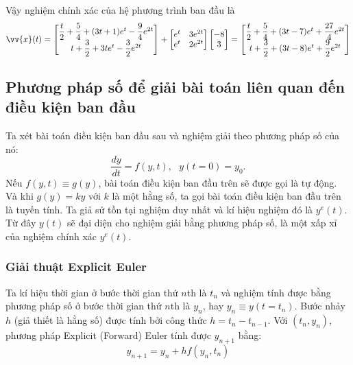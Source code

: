 \documentclass[a4paper]{article}
\begin{document}
Vậy nghiệm chính xác của hệ phương trình ban đầu là 
\[
    \vv{x}(t) = 
    \begin{bmatrix}
        \dfrac{t}{2} + \dfrac{5}{4} + (3t + 1)e^{t} - \dfrac{9}{4}e^{2t} \\
        t + \dfrac{3}{2} + 3te^{t} - \dfrac{3}{2}e^{2t}
    \end{bmatrix}
    + 
    \begin{bmatrix}
        e^t & 3e^{2t} \\
        e^t & 2e^{2t}
    \end{bmatrix}
    \begin{bmatrix}
        -8 \\
        3
    \end{bmatrix}
    = 
    \iffalse
    \begin{bmatrix}
        \dfrac{t}{2} + \dfrac{5}{4} + (3t + 1)e^{t} - \dfrac{9}{4}e^{2t} \\
        t + \dfrac{3}{2} + 3te^{t} - \dfrac{3}{2}e^{2t}
    \end{bmatrix}
    +
    \begin{bmatrix}
        -8e^{t} + 9e^{2t} \\
        -8e^{t} + 6e^{2t} 
    \end{bmatrix}
    =
    \fi
    \begin{bmatrix}
        \dfrac{t}{2} + \dfrac{5}{4} + (3t - 7)e^{t} + \dfrac{27}{4}e^{2t} \\
        t + \dfrac{3}{2} + (3t-8)e^{t} + \dfrac{9}{2}e^{2t}
    \end{bmatrix}
\]
\newpage
\subsection{Phương pháp số để giải bài toán liên quan đến điều kiện ban đầu}
Ta xét bài toán điều kiện ban đầu sau và nghiệm giải theo phương pháp số của nó:
\begin{equation}\label{eq:IVP}
    \frac{dy}{dt} = f(y,t), \:\:\: y(t=0) = y_0.
\end{equation}
Nếu $f(y,t)\equiv g(y)$, bài toán điều kiện ban đầu trên sẽ được gọi là tự động. Và khi $g(y) = ky$ với $k$ là một hằng số, ta gọi bài toán điều kiện ban đầu trên là tuyến tính. Ta giả sử tồn tại nghiệm duy nhất và kí hiệu nghiệm đó là $y^e(t)$. Từ đây $y(t)$ sẽ đại diện cho nghiệm giải bằng phương pháp số, là một xấp xỉ của nghiệm chính xác $y^e(t)$.
\subsubsection{Giải thuật Explicit Euler}\label{eulermethod}
Ta kí hiệu thời gian ở bước thời gian thứ $n$th là $t_n$ và nghiệm tính được bằng phương pháp số ở bước thời gian thứ $n$th là $y_n$, hay $y_n \equiv y(t=t_n)$. Bước nhảy $h$ (giả thiết là hằng số) được tính bởi công thức $h = t_n - t_{n-1}$. Với $(t_n, y_n)$, phương pháp Explicit (Forward) Euler tính được $y_{n+1}$ bằng:
\begin{equation}\label{eq:euler}
    y_{n+1} = y_n + h f(y_n, t_n)
\end{equation}
\end{document}
